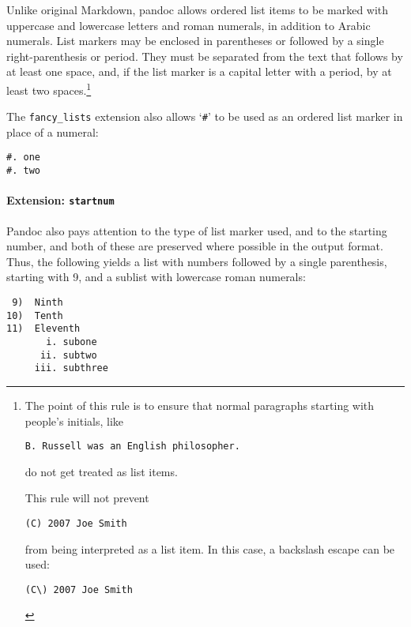 Unlike original Markdown, pandoc allows ordered list items to be marked
with uppercase and lowercase letters and roman numerals, in addition to
Arabic numerals. List markers may be enclosed in parentheses or followed
by a single right-parenthesis or period. They must be separated from the
text that follows by at least one space, and, if the list marker is a
capital letter with a period, by at least two spaces.\footnote{The point
  of this rule is to ensure that normal paragraphs starting with
  people's initials, like

\begin{Verbatim}
B. Russell was an English philosopher.
\end{Verbatim}

  do not get treated as list items.

  This rule will not prevent

\begin{Verbatim}
(C) 2007 Joe Smith
\end{Verbatim}

  from being interpreted as a list item. In this case, a backslash
  escape can be used:

\begin{Verbatim}
(C\) 2007 Joe Smith
\end{Verbatim}
}

The \texttt{fancy\_lists} extension also allows `\texttt{\#}' to be used
as an ordered list marker in place of a numeral:

\begin{verbatim}
#. one
#. two
\end{verbatim}

\hypertarget{extension-startnum}{%
\paragraph{\texorpdfstring{Extension:
\texttt{startnum}}{Extension: startnum}}\label{extension-startnum}}

Pandoc also pays attention to the type of list marker used, and to the
starting number, and both of these are preserved where possible in the
output format. Thus, the following yields a list with numbers followed
by a single parenthesis, starting with 9, and a sublist with lowercase
roman numerals:

\begin{verbatim}
 9)  Ninth
10)  Tenth
11)  Eleventh
       i. subone
      ii. subtwo
     iii. subthree
\end{verbatim}


